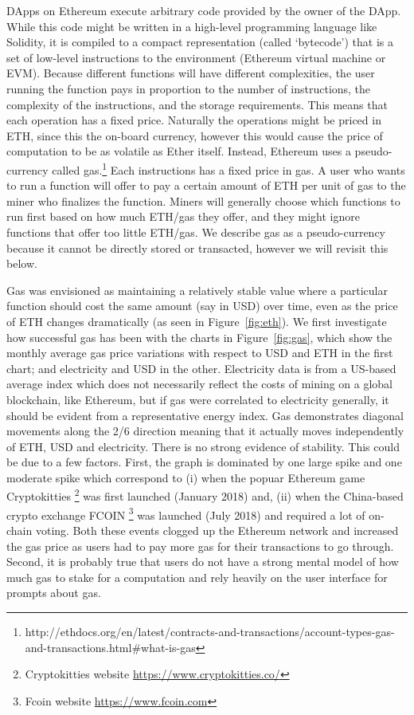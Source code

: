 DApps on Ethereum execute arbitrary code provided by the owner of the DApp. While this code might be written in a high-level programming language like Solidity, it is compiled to a compact representation (called `bytecode') that is a set of low-level instructions to the environment (Ethereum virtual machine or EVM). Because different functions will have different complexities, the user running the function pays in proportion to the number of instructions, the complexity of the instructions, and the storage requirements. This means that each operation has a fixed price. Naturally the operations might be priced in ETH, since this the on-board currency, however this would cause the price of computation to be as volatile as Ether itself. Instead, Ethereum uses a pseudo-currency called gas.\footnote{http://ethdocs.org/en/latest/contracts-and-transactions/account-types-gas-and-transactions.html\#what-is-gas} Each instructions has a fixed price in gas. A user who wants to run a function will offer to pay a certain amount of ETH per unit of gas to the miner who finalizes the function. Miners will generally choose which functions to run first based on how much ETH/gas they offer, and they might ignore functions that offer too little ETH/gas. We describe gas as a pseudo-currency because it cannot be directly stored or transacted, however we will revisit this below.

Gas was envisioned as maintaining a relatively stable value where a particular function should cost the same amount (say in USD) over time, even as the price of ETH changes dramatically (as seen in Figure~\ref{fig:eth}). We first investigate how successful gas has been with the charts in Figure~\ref{fig:gas}, which show the monthly average gas price variations with respect to USD and ETH in the first chart; and electricity and USD in the other. Electricity data is from a US-based average index which does not necessarily reflect the costs of mining on a global blockchain, like Ethereum, but if gas were correlated to electricity generally, it should be evident from a representative energy index. Gas demonstrates diagonal movements along the 2/6 direction meaning that it actually moves independently of ETH, USD and electricity. There is no strong evidence of stability. This could be due to a few factors. First, the graph is dominated by one large spike and one moderate spike which correspond to (i) when the popuar Ethereum game Cryptokitties \footnote{Cryptokitties website \url{https://www.cryptokitties.co/}} was first launched (January 2018) and, (ii) when the China-based crypto exchange FCOIN \footnote{Fcoin website \url{https://www.fcoin.com}} was launched (July 2018) and required a lot of on-chain voting. Both these events  clogged up the Ethereum network and increased the gas price as users had to pay more gas for their transactions to go through. Second, it is probably true that users do not have a strong mental model of how much gas to stake for a computation and rely heavily on the user interface for prompts about gas.

